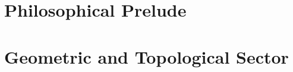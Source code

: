 \documentclass[11pt]{article}
\theoremstyle{definition}
\theoremstyle{plain}
\theoremstyle{remark}
\begin{document}
    \newpage



    \section{Philosophical Prelude}
        \label{sec:philosophy}
        
        

        
        

        
        

        
        

    \section{Geometric and Topological Sector}
        \label{sec:geometry}
        
        

        
        

        
\end{document}

